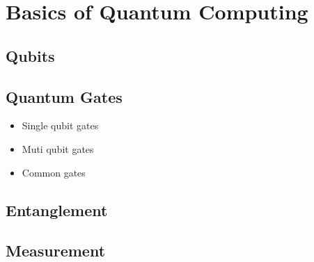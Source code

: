 %
%
\chapter {Basics of Quantum Computing}

\section{Qubits}

\section{Quantum Gates}


\begin{itemize}
    \item Single qubit gates
    \item Muti qubit gates
    \item Common gates
\end{itemize}

\section{Entanglement}

\section{Measurement}
